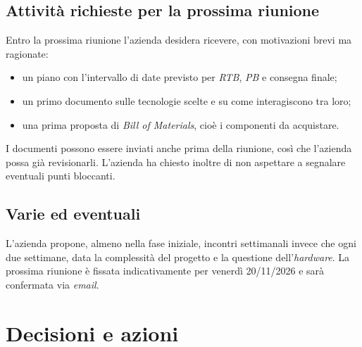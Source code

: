 \documentclass[12pt,a4paper]{article}
\newcommand{\tightlist}{\setlength{\itemsep}{1pt}\setlength{\parskip}{0pt}}
\begin{document}
\subsection{Attività richieste per la prossima riunione}

Entro la prossima riunione l'azienda desidera ricevere, con motivazioni brevi ma ragionate:
\begin{itemize}
\tightlist
\item un piano con l'intervallo di date previsto per \emph{RTB}, \emph{PB} e consegna finale;
\item un primo documento sulle tecnologie scelte e su come interagiscono tra loro;
\item una prima proposta di \emph{Bill of Materials}, cioè i componenti da acquistare.
\end{itemize}
I documenti possono essere inviati anche prima della riunione, così che l'azienda possa già revisionarli. L'azienda ha chiesto inoltre di non aspettare a segnalare eventuali punti bloccanti.

\subsection{Varie ed eventuali}

L'azienda propone, almeno nella fase iniziale, incontri settimanali invece che ogni due settimane, data la complessità del progetto e la questione dell'\emph{hardware}. La prossima riunione è fissata indicativamente per venerdì 20/11/2026 e sarà confermata via \emph{email}.

\section{Decisioni e azioni}
\end{document}
